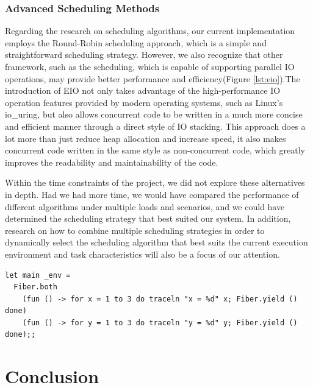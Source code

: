 \documentclass{l4proj}
\begin{document}
\subsection{Advanced Scheduling Methods}

Regarding the research on scheduling algorithms, our current implementation employs the Round-Robin scheduling approach, which is a simple and straightforward scheduling strategy. However, we also recognize that other framework, such as the \cite{_2024_ocamlmulticoreeio} scheduling, which is capable of supporting parallel IO operations, may provide better performance and efficiency(Figure \ref{lst:eio}).The introduction of EIO not only takes advantage of the high-performance IO operation features provided by modern operating systems, such as Linux's io\_uring, but also allows concurrent code to be written in a much more concise and efficient manner through a direct style of IO stacking. This approach does a lot more than just reduce heap allocation and increase speed, it also makes concurrent code written in the same style as non-concurrent code, which greatly improves the readability and maintainability of the code.

Within the time constraints of the project, we did not explore these alternatives in depth. Had we had more time, we would have compared the performance of different algorithms under multiple loads and scenarios, and we could have determined the scheduling strategy that best suited our system. In addition, research on how to combine multiple scheduling strategies in order to dynamically select the scheduling algorithm that best suits the current execution environment and task characteristics will also be a focus of our attention.

\noindent\begin{minipage}{\linewidth}
\lstset{style=ocamlstyle}
\begin{lstlisting}[caption={Example of running two threads of execution concurrently using Eio.Fiber}, label={lst:eio}]
let main _env =
  Fiber.both
    (fun () -> for x = 1 to 3 do traceln "x = %d" x; Fiber.yield () done)
    (fun () -> for y = 1 to 3 do traceln "y = %d" y; Fiber.yield () done);;
\end{lstlisting}
\end{minipage}


\chapter{Conclusion}    
\end{document}
